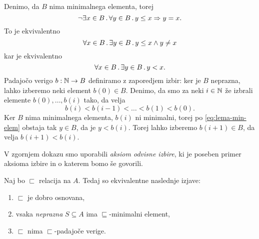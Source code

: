 \begin{dokaz}
  Denimo, da $B$ nima minimalnega elementa, torej
  \begin{equation*}
    \lnot \exists x \in B \,.\, \forall y \in B \,.\, y \leq x \Rightarrow y = x.
  \end{equation*}
  To je ekvivalentno
  \begin{equation*}
    \forall x \in B \,.\, \exists y \in B \,.\, y \leq x \land y \neq x
  \end{equation*}
  kar je ekvivalentno
  \begin{equation}
    \label{eq:lema-min-elem}
    \forall x \in B \,.\, \exists y \in B \,.\, y < x.
  \end{equation}
  Padajočo verigo $b : \mathbb{N} \to B$ definiramo z zaporedjem izbir: ker je $B$ neprazna, lahko izberemo
  neki element $b(0) \in B$. Denimo, da smo za neki $i \in \mathbb{N}$ že izbrali elemente $b(0), \ldots, b(i)$
  tako, da velja
  \begin{equation*}
    b(i) < b(i-1) < \ldots < b(1) < b(0).
  \end{equation*}
  Ker $B$ nima minimalnega elementa, $b(i)$ ni minimalni, torej po \eqref{eq:lema-min-elem} obstaja tak $y \in B$, da je $y < b(i)$. Torej lahko izberemo $b(i+1) \in B$, da velja $b(i+1) < b(i)$.
\end{dokaz}

\begin{opomba}
  V zgornjem dokazu smo uporabili \emph{aksiom odvisne izbire}, ki je poseben primer
  aksioma izbire in o katerem bomo še govorili.
\end{opomba}

\begin{izrek}
  \label{izr:dobr-osn-iff}
  Naj bo $\sqsubset$ relacija na $A$. Tedaj so ekvivalentne naslednje izjave:
  \begin{enumerate}
  \item \label{it:dobr-osn-1}%
    $\sqsubset$ je dobro osnovana,
  \item \label{it:dobr-osn-2}%
    vsaka \emph{neprazna} $S \subseteq A$ ima $\sqsubseteq$-minimalni element,
  \item \label{it:dobr-osn-3}%
    $\sqsubset$ nima $\sqsubset$-padajoče verige.
  \end{enumerate}
\end{izrek}

